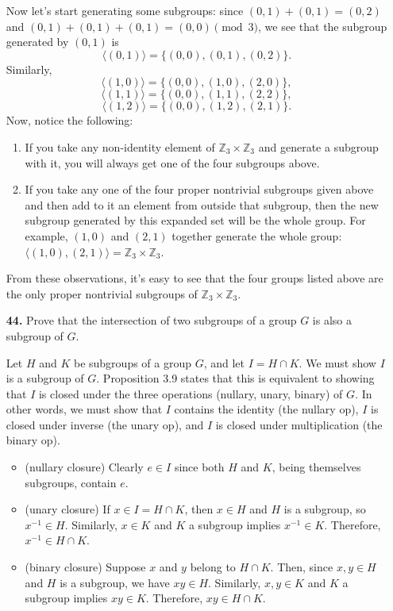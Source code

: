 \documentclass[12pt,reqno]{amsart}
\newcommand{\<}{\ensuremath{\langle}}
\renewcommand{\>}{\ensuremath{\rangle}}
\newcommand{\Z}{\ensuremath{\mathbb{Z}}}
\begin{document}
\begin{enumerate}
Now let's start generating some subgroups: since $(0,1) + (0,1) = (0,2)$
and $(0,1) + (0,1) + (0,1) = (0,0) \pmod 3$, we see that the subgroup generated
by $(0,1)$ is
\[
\<(0,1)\> = \{(0,0), (0,1), (0,2)\}.
\]
Similarly,
\[
\<(1,0)\> = \{(0,0), (1,0), (2,0)\},
\]
\[
\<(1,1)\> = \{(0,0), (1,1), (2,2)\},
\]
\[
\<(1,2)\> = \{(0,0), (1,2), (2,1)\}.
\]
Now, notice the following:
\begin{enumerate}
\item 
If you take any non-identity element of $\Z_3 \times \Z_3$ and generate a
subgroup with it, you will always get one of the four subgroups above.
\item If you take any one of the four proper nontrivial subgroups given above
  and then add to it an element from outside that subgroup, then the new 
  subgroup generated by this expanded set will be the whole group.  For
  example, $(1,0)$ and $(2,1)$ together generate the whole group: $\<(1,0), (2,1)\> = \Z_3 \times \Z_3$.
\end{enumerate}
From these observations, it's easy to see that the four groups listed above are
the only proper nontrivial subgroups of $\Z_3 \times \Z_3$. 

\item[{\bf 44.}]
Prove that the intersection of two subgroups of a group $G$ is also a
subgroup of $G$. 
 
\medskip
{} Let $H$ and $K$ be subgroups of a group $G$, and let
$I = H\cap K$.  We must show $I$ is a subgroup of $G$.
Proposition 3.9 states that this is equivalent to showing that $I$ is closed
under the three operations (nullary, unary, binary) of $G$.  In other words,
we must show that $I$ contains the identity (the nullary op), 
$I$ is closed under inverse (the unary op), and
$I$ is closed under multiplication (the binary op). 
\begin{itemize}
\item  (nullary closure) Clearly $e\in I$ since both $H$ and $K$, being themselves
  subgroups, contain $e$.
\item (unary closure) If $x\in I= H\cap K$, then
  $x \in H$ and $H$ is a subgroup, so $x^{-1}\in H$.
  Similarly, $x \in K$ and $K$ a subgroup implies $x^{-1}\in K$.
  Therefore, $x^{-1} \in H \cap K$.
\item (binary closure) Suppose $x$ and $y$ belong to $H\cap K$.
Then, since $x, y \in H$ and $H$ is a subgroup, we have $xy \in H$.
Similarly, $x, y \in K$ and $K$ a subgroup implies $xy \in K$.  Therefore, 
$xy \in H\cap K$.
\end{itemize}


\end{enumerate}
\end{document}
